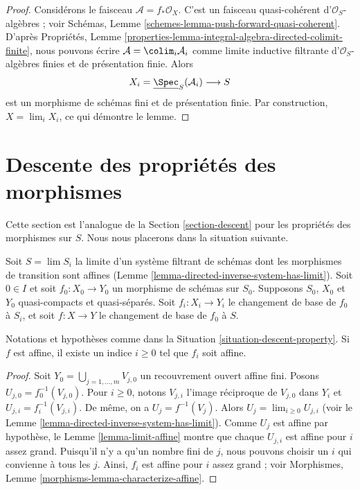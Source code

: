 \begin{proof}
Considérons le faisceau $\mathcal{A} = f_*\mathcal{O}_X$. C'est un faisceau
quasi-cohérent d'$\mathcal{O}_S$-algèbres ; voir Schémas,
Lemme \ref{schemes-lemma-push-forward-quasi-coherent}. D'après
Propriétés,
Lemme \ref{properties-lemma-integral-algebra-directed-colimit-finite}, nous
pouvons écrire $\mathcal{A} = \colim_i \mathcal{A}_i$ comme limite inductive
filtrante d'$\mathcal{O}_S$-algèbres finies et de présentation finie. Alors
$$
X_i = \underline{\Spec}_S(\mathcal{A}_i)
\longrightarrow
S
$$
est un morphisme de schémas fini et de présentation finie. Par construction,
$X = \lim_i X_i$, ce qui démontre le lemme.
\end{proof}








\section{Descente des propriétés des morphismes}
\label{section-descent-of-properties}

\noindent
Cette section est l'analogue de la Section \ref{section-descent} pour les
propriétés des morphismes sur $S$. Nous nous placerons dans la situation
suivante.

\begin{situation}
\label{situation-descent-property}
Soit $S = \lim S_i$ la limite d'un système filtrant de schémas dont les
morphismes de transition sont affines
(Lemme \ref{lemma-directed-inverse-system-has-limit}). Soit $0 \in I$ et soit
$f_0 : X_0 \to Y_0$ un morphisme de schémas sur $S_0$. Supposons $S_0$,
$X_0$ et $Y_0$ quasi-compacts et quasi-séparés. Soit
$f_i : X_i \to Y_i$ le changement de base de $f_0$ à $S_i$, et soit
$f : X \to Y$ le changement de base de $f_0$ à $S$.
\end{situation}

\begin{lemma}
\label{lemma-descend-affine-finite-presentation}
Notations et hypothèses comme dans la
Situation \ref{situation-descent-property}. Si $f$ est affine, il existe un
indice $i \geq 0$ tel que $f_i$ soit affine.
\end{lemma}

\begin{proof}
Soit $Y_0 = \bigcup_{j = 1, \ldots, m} V_{j, 0}$ un recouvrement ouvert
affine fini. Posons $U_{j, 0} = f_0^{-1}(V_{j, 0})$. Pour $i \geq 0$, notons
$V_{j, i}$ l'image réciproque de $V_{j, 0}$ dans $Y_i$ et
$U_{j, i} = f_i^{-1}(V_{j, i})$. De même, on a $U_j = f^{-1}(V_j)$. Alors
$U_j = \lim_{i \geq 0} U_{j, i}$ (voir le
Lemme \ref{lemma-directed-inverse-system-has-limit}). Comme $U_j$ est affine
par hypothèse, le Lemme \ref{lemma-limit-affine} montre que chaque $U_{j, i}$
est affine pour $i$ assez grand. Puisqu'il n'y a qu'un nombre fini de $j$,
nous pouvons choisir un $i$ qui convienne à tous les $j$. Ainsi, $f_i$ est affine
pour $i$ assez grand ; voir Morphismes,
Lemme \ref{morphisms-lemma-characterize-affine}.
\end{proof}

